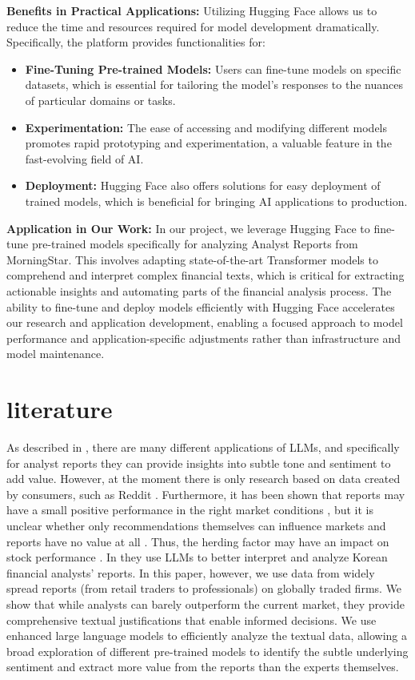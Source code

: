 \documentclass[conference]{IEEEtran}
\begin{document}
\textbf{Benefits in Practical Applications:} Utilizing Hugging Face allows us to reduce the time and resources required for model development dramatically. Specifically, the platform provides functionalities for:
\begin{itemize}
    \item \textbf{Fine-Tuning Pre-trained Models:} Users can fine-tune models on specific datasets, which is essential for tailoring the model's responses to the nuances of particular domains or tasks.
    \item \textbf{Experimentation:} The ease of accessing and modifying different models promotes rapid prototyping and experimentation, a valuable feature in the fast-evolving field of AI.
    \item \textbf{Deployment:} Hugging Face also offers solutions for easy deployment of trained models, which is beneficial for bringing AI applications to production.
\end{itemize}

\textbf{Application in Our Work:} In our project, we leverage Hugging Face to fine-tune pre-trained models specifically for analyzing Analyst Reports from MorningStar. This involves adapting state-of-the-art Transformer models \cite{wolf2020huggingfaces} to comprehend and interpret complex financial texts, which is critical for extracting actionable insights and automating parts of the financial analysis process. The ability to fine-tune and deploy models efficiently with Hugging Face accelerates our research and application development, enabling a focused approach to model performance and application-specific adjustments rather than infrastructure and model maintenance.

\section{literature}%

As described in \cite{Zhao2024}, there are many different applications of LLMs, and specifically for analyst reports they can provide insights into subtle tone and sentiment to add value. However, at the moment there is only research based on   data created by consumers, such as Reddit \cite{Deng2023}. Furthermore, it has been shown that reports may have a small positive performance in the right market conditions \cite{Su2020}, but it is unclear whether only recommendations themselves can influence markets \cite{Brauer2018} and reports have no value at all \cite{Panchenko2007}. Thus, the herding factor may have an impact on stock performance \cite{Palmer2018}.
In \cite{Kim2023} they use LLMs to better interpret and analyze Korean financial analysts' reports.
In this paper, however, we use data from widely spread reports (from retail traders to professionals) on globally traded firms. We show that while analysts can barely outperform the current market, they provide comprehensive textual justifications that enable informed decisions. We use enhanced large language models to efficiently analyze the textual data, allowing a broad exploration of different pre-trained models to identify the subtle underlying sentiment and extract more value from the reports than the experts themselves.
\end{document}
